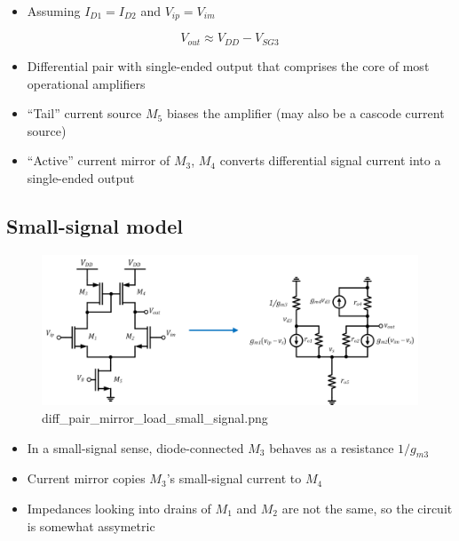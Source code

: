 \documentclass[11pt]{article}
\providecommand{\tightlist}{%
      \setlength{\itemsep}{0pt}\setlength{\parskip}{0pt}}
\begin{document}
\begin{itemize}
\tightlist
\item
  Assuming \(I_{D1} = I_{D2}\) and \(V_{ip} = V_{im}\)
\end{itemize}

\begin{equation}
V_{out} \approx V_{DD} - V_{SG3}
\end{equation}

    \begin{itemize}
\tightlist
\item
  Differential pair with single-ended output that comprises the core of
  most operational amplifiers
\item
  ``Tail'' current source \(M_5\) biases the amplifier (may also be a
  cascode current source)
\item
  ``Active'' current mirror of \(M_3\), \(M_4\) converts differential
  signal current into a single-ended output
\end{itemize}

    \hypertarget{small-signal-model}{%
\subsection{Small-signal model}\label{small-signal-model}}

    \begin{figure}
\centering
\includegraphics{diff_pair_mirror_load_small_signal.png}
\caption{diff\_pair\_mirror\_load\_small\_signal.png}
\end{figure}

    \begin{itemize}
\tightlist
\item
  In a small-signal sense, diode-connected \(M_3\) behaves as a
  resistance \(1/g_{m3}\)
\item
  Current mirror copies \(M_3\)'s small-signal current to \(M_4\)
\item
  Impedances looking into drains of \(M_1\) and \(M_2\) are not the
  same, so the circuit is somewhat assymetric
\end{itemize}
\end{document}
